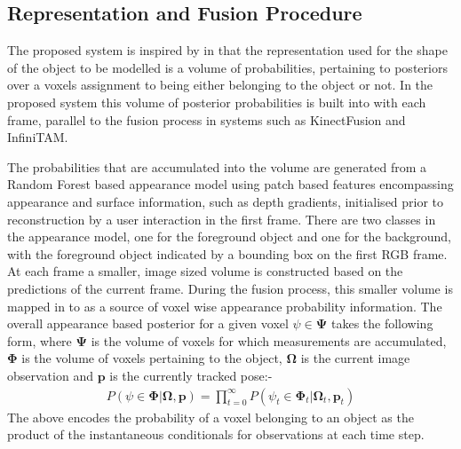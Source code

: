 \subsection{Representation and Fusion Procedure}
The proposed system is inspired by\cite{Kolev2006} in that the representation used for the shape of the object to be modelled is a volume 
of probabilities, pertaining to posteriors over a voxels assignment to being either belonging to the object or not. In the proposed system this 
volume of posterior probabilities is built into with each frame, parallel to the fusion process in systems such as KinectFusion\cite{Newcombe2011} 
and InfiniTAM\cite{Prisacariu2014}.

The probabilities that are accumulated into the volume are generated from a Random Forest based appearance model using patch based features encompassing 
appearance and surface information, such as depth gradients, initialised prior to reconstruction by a user interaction in the first frame. There are two 
classes in the appearance model, one for the foreground object and one for the background, with the foreground object indicated by a bounding box on the 
first RGB frame. At each frame a smaller, image sized volume is constructed based on the predictions of the current frame. During the fusion process, this 
smaller volume is mapped in to as a source of voxel wise appearance probability information. The overall appearance based posterior for a given voxel 
$\psi \in \mathbf{\Psi}$ takes the following form, where $\mathbf{\Psi}$ is the volume of voxels for which measurements are accumulated, $\mathbf{\Phi}$ 
is the volume of voxels pertaining to the object, $\mathbf{\Omega}$ is the current image observation and $\mathbf{p}$ is the currently tracked pose:-
\begin{equation}
\begin{split}
P(\psi \in \mathbf{\Phi} | \mathbf{\Omega}, \mathbf{p}) = \prod_{t=0}^{\infty} P(\psi_{t} \in \mathbf{\Phi}_{t} | \mathbf{\Omega}_{t}, \mathbf{p}_{t})
\end{split}
\end{equation}
The above encodes the probability of a voxel belonging to an object as the product of the instantaneous conditionals for observations at each time step.

